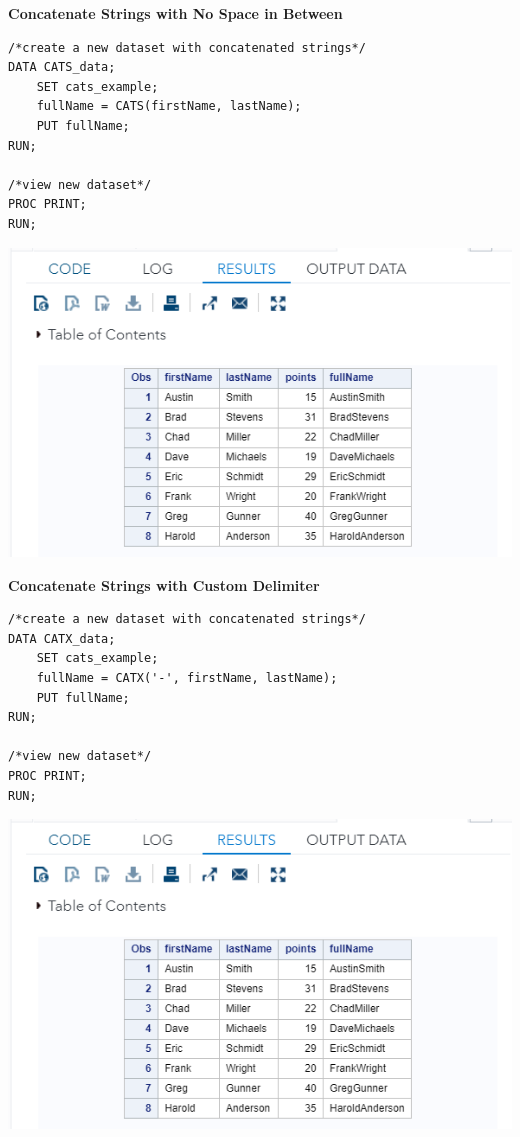 \documentclass[
]{book}
\begin{document}
\textbf{Concatenate Strings with No Space in Between}

\begin{verbatim}
/*create a new dataset with concatenated strings*/
DATA CATS_data;
    SET cats_example;
    fullName = CATS(firstName, lastName);
    PUT fullName;
RUN;

/*view new dataset*/
PROC PRINT; 
RUN;
\end{verbatim}

\begin{center}\includegraphics[width=1\linewidth]{img10/w10-CATS-output} \end{center}

\textbf{Concatenate Strings with Custom Delimiter}

\begin{verbatim}
/*create a new dataset with concatenated strings*/
DATA CATX_data;
    SET cats_example;
    fullName = CATX('-', firstName, lastName);
    PUT fullName;
RUN;

/*view new dataset*/
PROC PRINT; 
RUN;
\end{verbatim}

\begin{center}\includegraphics[width=1\linewidth]{img10/w10-CATS-output} \end{center}
\end{document}
